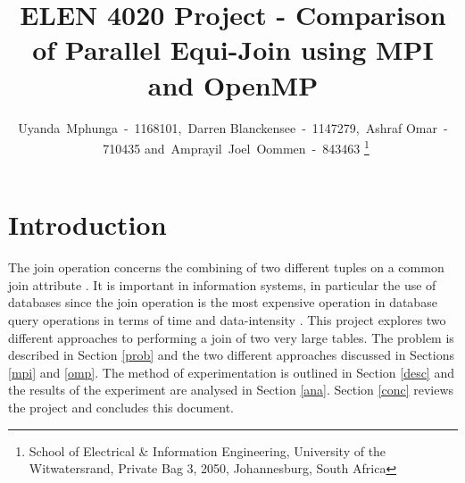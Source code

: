 \documentclass[journal,draftclsnofoot]{IEEEtran}
\begin{document}
\title{ELEN 4020 Project - Comparison of Parallel Equi-Join using MPI and OpenMP}
\author{Uyanda~Mphunga~-~1168101,~Darren Blanckensee~-~1147279,~Ashraf Omar~-~710435 and~Amprayil~Joel~Oommen~-~843463
\thanks{School of Electrical \& Information Engineering, University of the
Witwatersrand, Private Bag 3, 2050, Johannesburg, South Africa}
}
\maketitle
\pagestyle{plain}
\begin{abstract}

\end{abstract}
\section{Introduction}
The join operation concerns the combining of two different tuples on a common join attribute \cite{Yu1998}. It is important in information systems, in particular the use of databases since the join operation is the most expensive operation in database query operations in terms of time and data-intensity \cite{Mishra1992}. This project explores two different approaches to performing a join of two very large tables. The problem is described in Section \ref{prob} and the two different approaches discussed in Sections \ref{mpi} and \ref{omp}. The method of experimentation is outlined in Section \ref{desc} and the results of the experiment are analysed in Section \ref{ana}. Section \ref{conc} reviews the project and concludes this document.
\end{document}
